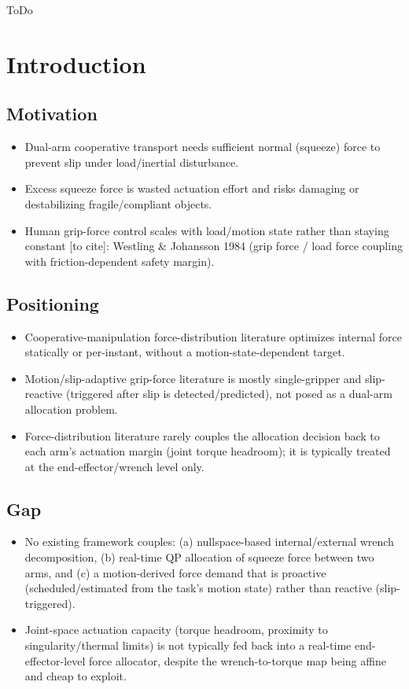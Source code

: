 \documentclass[conference]{IEEEtran}
\begin{document}
\begin{IEEEkeywords}
ToDo \cite{uchiyama1988symmetric}
\end{IEEEkeywords}

\section{Introduction}

\subsection{Motivation}
    \begin{itemize}
        \item Dual-arm cooperative transport needs sufficient normal (squeeze) force to prevent slip under load/inertial disturbance.
        \item Excess squeeze force is wasted actuation effort and risks damaging or destabilizing fragile/compliant objects.
        \item Human grip-force control scales with load/motion state rather than staying constant [to cite]: Westling \& Johansson 1984 (grip force / load force coupling with friction-dependent safety margin).
    \end{itemize}
\subsection*{Positioning}
\begin{itemize}
    \item Cooperative-manipulation force-distribution literature optimizes internal force statically or per-instant, without a motion-state-dependent target.
    \item Motion/slip-adaptive grip-force literature is mostly single-gripper and slip-reactive (triggered after slip is detected/predicted), not posed as a dual-arm allocation problem.
    \item Force-distribution literature rarely couples the allocation decision back to each arm's actuation margin (joint torque headroom); it is typically treated at the end-effector/wrench level only.
\end{itemize}
\subsection*{Gap}
\begin{itemize}
    \item No existing framework couples: (a) nullspace-based internal/external wrench decomposition, (b) real-time QP allocation of squeeze force between two arms, and (c) a motion-derived force demand that is proactive (scheduled/estimated from the task's motion state) rather than reactive (slip-triggered).
    \item Joint-space actuation capacity (torque headroom, proximity to singularity/thermal limits) is not typically fed back into a real-time end-effector-level force allocator, despite the wrench-to-torque map being affine and cheap to exploit.
\end{itemize}
\end{document}
